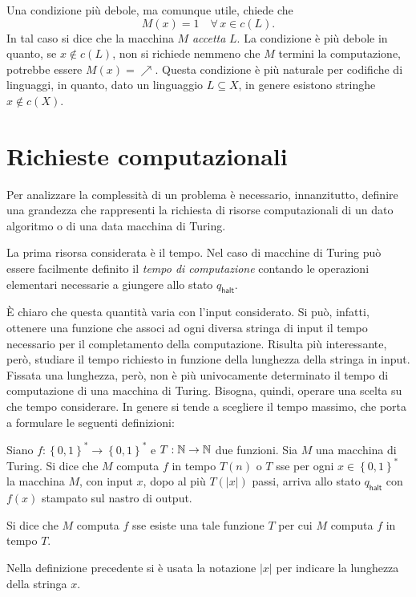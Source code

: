 Una condizione più debole, ma comunque utile, chiede che
\begin{equation}
 M(x) = 1 \quad \forall \, x \in c(L).
\end{equation}
In tal caso si dice che la macchina $M$ \textit{accetta} $L$.
La condizione è più debole in quanto, se $x \notin c(L)$, non si richiede nemmeno che $M$ termini la computazione, potrebbe essere $M(x) = \nearrow$.
Questa condizione è più naturale per codifiche di linguaggi, in quanto, dato un linguaggio $L \subseteq X$, in genere esistono stringhe $x \notin c(X)$.

\section{Richieste computazionali}
Per analizzare la complessità di un problema è necessario, innanzitutto, definire una grandezza che rappresenti la richiesta di risorse computazionali di un dato algoritmo o di una data macchina di Turing.

La prima risorsa considerata è il tempo.
Nel caso di macchine di Turing può essere facilmente definito il \textit{tempo di computazione} contando le operazioni elementari necessarie a giungere allo stato $q_{\mathsf{halt}}$.

È chiaro che questa quantità varia con l'input considerato.
Si può, infatti, ottenere una funzione che associ ad ogni diversa stringa di input il tempo necessario per il completamento della computazione.
Risulta più interessante, però, studiare il tempo richiesto in funzione della lunghezza della stringa in input.
Fissata una lunghezza, però, non è più univocamente determinato il tempo di computazione di una macchina di Turing. 
Bisogna, quindi, operare una scelta su che tempo considerare.
In genere si tende a scegliere il tempo massimo, che porta a formulare le seguenti definizioni:
\begin{defn}\label{defn:running_time}
 Siano $f: \left\{0,1\right\}^* \to \left\{0,1\right\}^*$ e $T: \mathbb{N} \to \mathbb{N}$ due funzioni.
 Sia $M$ una macchina di Turing.
 Si dice che $M$ {\upshape computa} $f$ in tempo $T(n)$ o $T$ sse per ogni $x \in \left\{0,1\right\}^*$ la macchina $M$, con input $x$, dopo al più $T(|x|)$ passi, arriva allo stato $q_{\mathsf{halt}}$ con $f(x)$ stampato sul nastro di output.
 
 Si dice che $M$ {\upshape computa} $f$ sse esiste una tale funzione $T$ per cui $M$ computa $f$ in tempo $T$.
\end{defn}
Nella definizione precedente si è usata la notazione $|x|$ per indicare la lunghezza della stringa $x$.

